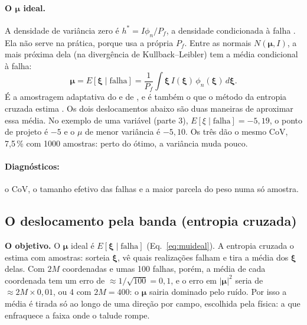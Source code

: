 \documentclass[11pt,a4paper]{article}
\newcommand{\xib}{\bm\xi}
\begin{document}
\paragraph{O $\bm\mu$ ideal.} A densidade de variância zero é $h^* = I\phi_n/P_f$, a densidade condicionada à falha
\citep[Eq.~6.26]{beck2014}. Ela não serve na prática, porque usa a própria $P_f$. Entre as normais $N(\bm\mu, I)$, a
mais próxima dela (na divergência de Kullback--Leibler) tem a média condicional à falha:
\begin{equation}
  \bm\mu = E[\xib \mid \text{falha}] = \frac{1}{P_f}\int \xib\,I(\xib)\,\phi_n(\xib)\,d\xib.
  \label{eq:muideal}
\end{equation}
É a amostragem adaptativa do \citet[Seç.~6.3.4, Eq.~6.31]{beck2014} e de \citet{bucher1988}, e é também o que o método da
entropia cruzada estima \citep{rubinstein2004}. Os dois deslocamentos abaixo são duas maneiras de aproximar essa média.
No exemplo de uma variável (parte 3), $E[\xi \mid \text{falha}] = -5{,}19$, o ponto de projeto é $-5$ e o $\mu$ de menor
variância é $-5{,}10$. Os três dão o mesmo CoV, 7,5\,\% com 1000 amostras: perto do ótimo, a variância muda pouco.

\paragraph{Diagnósticos:} o CoV, o tamanho efetivo das falhas e a maior parcela do peso numa só amostra.

\subsection{O deslocamento pela banda (entropia cruzada)}\label{sec:banda}
\textbf{O objetivo.} O $\bm\mu$ ideal é $E[\xib \mid \text{falha}]$ (Eq.~\ref{eq:muideal}). A entropia cruzada o
estima com amostras: sorteia $\xib$, vê quais realizações falham e tira a média dos $\xib$ delas. Com $2M$ coordenadas e
umas 100 falhas, porém, a média de cada coordenada tem um erro de $\approx 1/\sqrt{100} = 0{,}1$, e o erro em
$|\bm\mu|^2$ seria de $\approx 2M\times0{,}01$, ou 4 com $2M = 400$: o $\bm\mu$ sairia dominado pelo ruído. Por isso a
média é tirada só ao longo de uma direção por campo, escolhida pela física: a que enfraquece a faixa onde o talude rompe.
\end{document}
